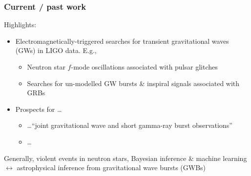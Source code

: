 \documentclass{beamer}
\def\gw#1{gravitational wave#1 (GW#1)\gdef\gw{GW}}
\def\gwb#1{gravitational wave burst#1 (GWB#1)\gdef\gw{GWB}}
\newcommand{\red}[1]{{\color{red}{#1}}}
\begin{document}
\begin{frame}
    \frametitle{Current / past work}
    Highlights:
    \begin{itemize}
        \item Electromagnetically-triggered searches for transient \gw{s} in LIGO data.
            E.g.,
            \begin{itemize}
                \item Neutron star $f$-mode oscillations associated with pulsar
                    glitches~\cite{s5velaglitch-paper}
                \item Searches for un-modelled GW bursts \& inspiral signals
                    associated with
                    GRBs~\cite{2012arXiv1201.4413T,0004-637X-760-1-12}
            \end{itemize}
        \item Prospects for \dots
            \begin{itemize}
                \item \dots ``joint gravitational wave and short gamma-ray burst
                    observations''~\cite{2014arXiv1409.8149C}
                \item \dots \red{``high frequency burst searches following binary
                    neutron star coalescence with advanced gravitational wave
                detectors''}~\cite{clark:14}
            \end{itemize}
    \end{itemize}

        Generally, violent events in neutron stars, Bayesian inference \&
    machine learning $\leftrightarrow$ astrophysical inference from \gwb{s}

\end{frame}


\end{document}
